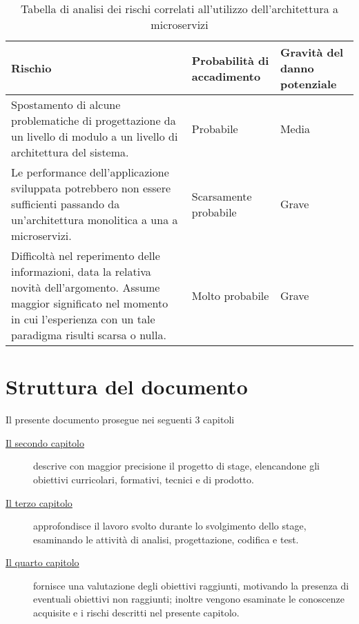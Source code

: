 \begin{table}
\caption{Tabella di analisi dei rischi correlati all'utilizzo dell'architettura a microservizi}
\label{tab:rischi-arch-microservizi}
\begin{tabularx}{\linewidth}{|p{7.5cm}|X|X|}
\hline
\textbf{Rischio} & \textbf{Probabilità di accadimento} & \textbf{Gravità del danno potenziale}\\
\hline
Spostamento di alcune problematiche di progettazione da un livello di modulo a un livello di architettura del sistema. & Probabile & Media \\
\hline
Le performance dell'applicazione sviluppata potrebbero non essere sufficienti passando da un'architettura monolitica a una a microservizi. & Scarsamente probabile & Grave \\
\hline
Difficoltà nel reperimento delle informazioni, data la relativa novità dell'argomento. Assume maggior significato nel momento in cui l'esperienza con un tale paradigma risulti scarsa o nulla. & Molto probabile & Grave \\
\hline
\end{tabularx}
\end{table}

\section{Struttura del documento}

Il presente documento prosegue nei seguenti 3 capitoli
\begin{description}
    \item[{\hyperref[cap:processi-metodologie]{Il secondo capitolo}}] descrive con maggior precisione il progetto di stage, elencandone gli obiettivi curricolari, formativi, tecnici e di prodotto.

    \item[{\hyperref[cap:descrizione-stage]{Il terzo capitolo}}] approfondisce il lavoro svolto durante lo svolgimento dello stage, esaminando le attività di analisi, progettazione, codifica e test.

    \item[{\hyperref[cap:analisi-requisiti]{Il quarto capitolo}}] fornisce una valutazione degli obiettivi raggiunti, motivando la presenza di eventuali obiettivi non raggiunti; inoltre vengono esaminate le conoscenze acquisite e i rischi descritti nel presente capitolo.

\end{description}
